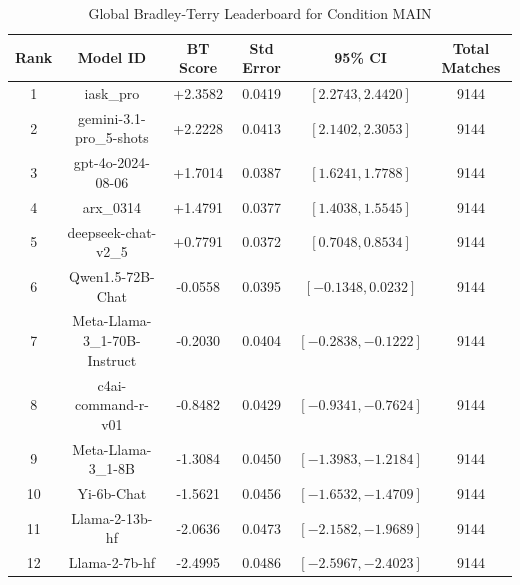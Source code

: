 \begin{table}[ht]
\centering
\caption{Global Bradley-Terry Leaderboard for Condition \textsc{MAIN}}
\label{tab:leaderboard_main}
\begin{tabular}{cccccc}
\hline
\textbf{Rank} & \textbf{Model ID} & \textbf{BT Score} & \textbf{Std Error} & \textbf{95\% CI} & \textbf{Total Matches} \\
\hline
1 & iask\_pro & +2.3582 & 0.0419 & $[2.2743, 2.4420]$ & 9144 \\
2 & gemini-3.1-pro\_5-shots & +2.2228 & 0.0413 & $[2.1402, 2.3053]$ & 9144 \\
3 & gpt-4o-2024-08-06 & +1.7014 & 0.0387 & $[1.6241, 1.7788]$ & 9144 \\
4 & arx\_0314 & +1.4791 & 0.0377 & $[1.4038, 1.5545]$ & 9144 \\
5 & deepseek-chat-v2\_5 & +0.7791 & 0.0372 & $[0.7048, 0.8534]$ & 9144 \\
6 & Qwen1.5-72B-Chat & -0.0558 & 0.0395 & $[-0.1348, 0.0232]$ & 9144 \\
7 & Meta-Llama-3\_1-70B-Instruct & -0.2030 & 0.0404 & $[-0.2838, -0.1222]$ & 9144 \\
8 & c4ai-command-r-v01 & -0.8482 & 0.0429 & $[-0.9341, -0.7624]$ & 9144 \\
9 & Meta-Llama-3\_1-8B & -1.3084 & 0.0450 & $[-1.3983, -1.2184]$ & 9144 \\
10 & Yi-6b-Chat & -1.5621 & 0.0456 & $[-1.6532, -1.4709]$ & 9144 \\
11 & Llama-2-13b-hf & -2.0636 & 0.0473 & $[-2.1582, -1.9689]$ & 9144 \\
12 & Llama-2-7b-hf & -2.4995 & 0.0486 & $[-2.5967, -2.4023]$ & 9144 \\
\hline
\end{tabular}
\end{table}
